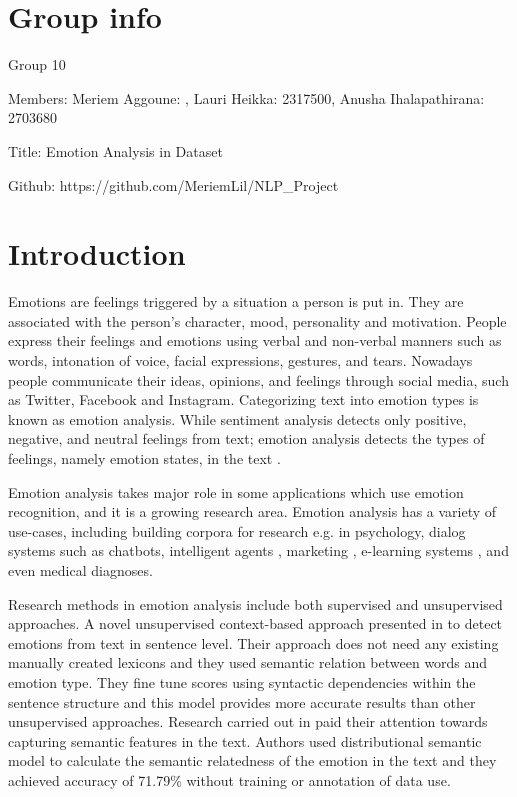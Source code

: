 \documentclass[conference]{IEEEtran}
\begin{document}
\section{Group info}
Group 10

Members: Meriem Aggoune: , Lauri Heikka: 2317500, Anusha Ihalapathirana: 2703680

Title: Emotion Analysis in Dataset

Github: https://github.com/MeriemLil/NLP\_Project

\section{Introduction}
Emotions are feelings triggered by a situation a person is put in. They are associated with the person’s character, mood, personality and motivation. People express their feelings and emotions using verbal and non-verbal manners such as words, intonation of voice, facial expressions, gestures, and tears. Nowadays people communicate their ideas, opinions, and feelings through social media, such as Twitter, Facebook and Instagram. Categorizing text into emotion types is known as emotion analysis. While sentiment analysis detects only positive, negative, and neutral feelings from text; emotion analysis detects the types of feelings, namely emotion states, in the text \cite{emotiondetection}. 

Emotion analysis takes major role in some applications which use emotion recognition, and it is a growing research area. Emotion analysis has a variety of use-cases, including building corpora for research e.g. in psychology, dialog systems such as chatbots, intelligent agents \cite{klinger2018analysis}, marketing \cite{businesscase}, e-learning systems \cite{elearning}, and even medical diagnoses\cite{calvo2017natural}.

Research methods  in emotion analysis include both supervised and unsupervised approaches. A novel unsupervised context-based approach presented in \cite{unsupervisedemotiondetection} to detect emotions from text in sentence level. Their approach does not need any existing manually created lexicons and they used semantic relation between words and emotion type. They fine tune scores using syntactic dependencies within the sentence structure and this model provides more accurate results than other unsupervised approaches. Research carried out in \cite{jan2020emotion} paid their attention towards capturing semantic features in the text. Authors used distributional semantic model to calculate the semantic relatedness of the emotion in the text and they achieved accuracy of 71.79\% without training or annotation of data use.
\end{document}
